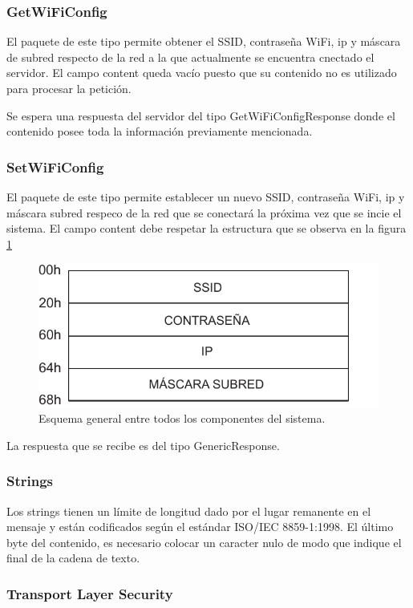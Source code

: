 \subsubsection{GetWiFiConfig}

El paquete de este tipo permite obtener el SSID, contraseña WiFi, ip y máscara de subred respecto de la red a la que actualmente se encuentra cnectado el servidor.
El campo content queda vacío puesto que su contenido no es utilizado para procesar la petición.

Se espera una respuesta del servidor del tipo GetWiFiConfigResponse donde el contenido posee toda la información previamente mencionada.



\subsubsection{SetWiFiConfig}

El paquete de este tipo permite establecer un nuevo SSID, contraseña WiFi, ip y máscara subred respeco de la red que se conectará la próxima vez que se incie el sistema.
El campo content debe respetar la estructura que se observa en la figura \ref{fig:paquete-wifi}


\begin{figure}[!ht]
	\centering
	\includegraphics[width=0.5\linewidth]{imagenes/protocolo/paquete-wifi.pdf}
	\caption{Esquema general entre todos los componentes del sistema.}
	\label{fig:paquete-wifi}
\end{figure}

La respuesta que se recibe es del tipo GenericResponse.


\subsubsection{Strings}

Los strings tienen un límite de longitud dado por el lugar remanente en el mensaje y están codificados según el estándar ISO/IEC 8859-1:1998.
El último byte del contenido, es necesario colocar un caracter nulo de modo que indique el final de la cadena de texto.


\subsubsection{Transport Layer Security}\label{sec:tls}